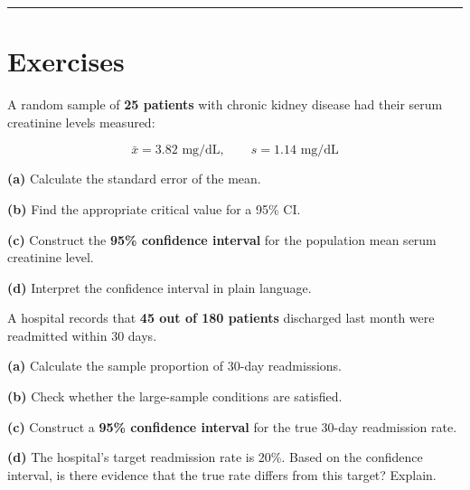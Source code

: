\documentclass[
  12pt,
  letterpaper,
]{book}
\begin{document}
\begin{center}\rule{0.5\linewidth}{0.5pt}\end{center}


\chapter{Exercises}\label{exercises-3}

\begin{tcolorbox}[enhanced jigsaw, arc=.35mm, bottomrule=.15mm, bottomtitle=1mm, breakable, colback=white, colbacktitle=quarto-callout-caution-color!10!white, colframe=quarto-callout-caution-color-frame, coltitle=black, left=2mm, leftrule=.75mm, opacityback=0, opacitybacktitle=0.6, rightrule=.15mm, title={✏️ Exercise 1}, titlerule=0mm, toprule=.15mm, toptitle=1mm]

A random sample of \textbf{25 patients} with chronic kidney disease had
their serum creatinine levels measured:

\[\bar{x} = 3.82 \text{ mg/dL}, \qquad s = 1.14 \text{ mg/dL}\]

\textbf{(a)} Calculate the standard error of the mean.

\textbf{(b)} Find the appropriate critical value for a 95\% CI.

\textbf{(c)} Construct the \textbf{95\% confidence interval} for the
population mean serum creatinine level.

\textbf{(d)} Interpret the confidence interval in plain language.

\end{tcolorbox}

\begin{tcolorbox}[enhanced jigsaw, arc=.35mm, bottomrule=.15mm, bottomtitle=1mm, breakable, colback=white, colbacktitle=quarto-callout-caution-color!10!white, colframe=quarto-callout-caution-color-frame, coltitle=black, left=2mm, leftrule=.75mm, opacityback=0, opacitybacktitle=0.6, rightrule=.15mm, title={✏️ Exercise 2}, titlerule=0mm, toprule=.15mm, toptitle=1mm]

A hospital records that \textbf{45 out of 180 patients} discharged last
month were readmitted within 30 days.

\textbf{(a)} Calculate the sample proportion of 30-day readmissions.

\textbf{(b)} Check whether the large-sample conditions are satisfied.

\textbf{(c)} Construct a \textbf{95\% confidence interval} for the true
30-day readmission rate.

\textbf{(d)} The hospital's target readmission rate is 20\%. Based on
the confidence interval, is there evidence that the true rate differs
from this target? Explain.

\end{tcolorbox}
\end{document}
